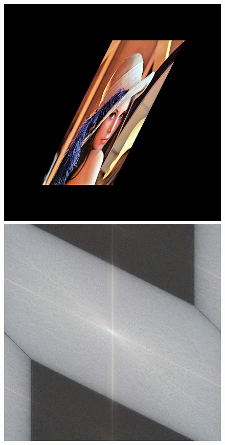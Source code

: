 \begin{figure}
{			{\includegraphics[scale=0.125]{decompoSzeliski_image3.png}}
			{\includegraphics[scale=0.125]{decompoSzeliski_fourier3.png}}
		}
\end{figure}
